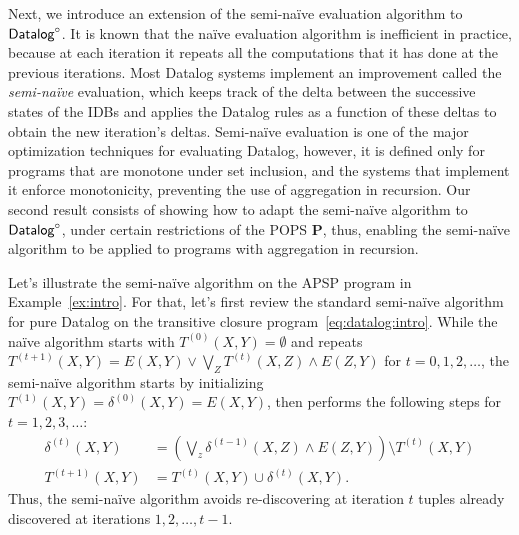 Next, we introduce an extension of the semi-na\"ive evaluation
algorithm to $\text{\sf Datalog}^\circ$.  It is known that the na\"ive evaluation
algorithm is inefficient in practice, because at each iteration it
repeats all the computations that it has done at the previous
iterations.  Most Datalog systems implement an improvement called the
{\em semi-na\"ive} evaluation, which keeps track of the delta between
the successive states of the IDBs and applies the Datalog rules as a
function of these deltas to obtain the new iteration's deltas.
Semi-na\"ive evaluation is one of the major optimization techniques
for evaluating Datalog, however, it is defined only for programs that
are monotone under set inclusion, and the systems that implement it
enforce monotonicity, preventing the use of aggregation in
recursion. Our second result consists of showing how to adapt the
semi-na\"ive algorithm to $\text{\sf Datalog}^\circ$, under certain restrictions of the
POPS $\bm P$, thus, enabling the semi-na\"ive algorithm to be applied
to programs with aggregation in recursion.

Let's illustrate the semi-na\"ive algorithm on the APSP program in
Example~\ref{ex:intro}.  For that, let's first review the standard
semi-na\"ive algorithm for pure Datalog on the transitive closure
program~\eqref{eq:datalog:intro}.  While the na\"ive algorithm starts
with $T^{(0)}(X,Y)=\emptyset$ and repeats
$T^{(t+1)}(X,Y) = E(X,Y) \vee \bigvee_Z T^{(t)}(X,Z) \wedge E(Z,Y)$
for $t=0,1,2,\ldots$, the semi-na\"ive algorithm starts by
initializing $T^{(1)}(X,Y) = \delta^{(0)}(X,Y) = E(X,Y)$, then
performs the following steps for $t=1,2,3,\ldots$:
%
\begin{align}
  \delta^{(t)}(X,Y) &= \left(\bigvee_z \delta^{(t-1)}(X,Z) \wedge E(Z,Y) \right) \setminus T^{(t)}(X,Y) \label{eqn:deltat}\\
  T^{(t+1)}(X,Y) &= T^{(t)}(X,Y) \cup \delta^{(t)}(X,Y).\nonumber
\end{align}
%
Thus, the semi-na\"ive algorithm avoids re-discovering at iteration
$t$ tuples already discovered at iterations $1,2,\ldots, t-1$.

